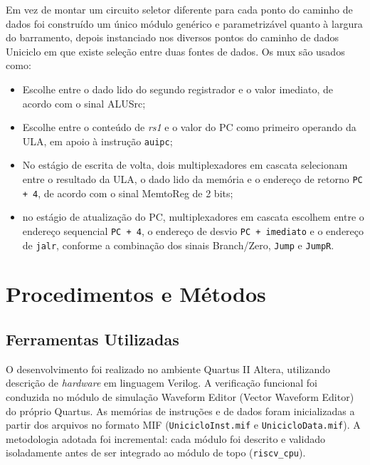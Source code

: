 \documentclass[conference]{IEEEtran}
\begin{document}
Em vez de montar um circuito seletor diferente para cada ponto do caminho de dados foi construído um único módulo 
genérico e parametrizável quanto à largura do barramento, depois
instanciado nos diversos pontos do caminho de dados Uniciclo em que existe seleção entre duas fontes de
dados. Os mux são usados como:
\begin{itemize}
    \item Escolhe entre o dado lido do segundo registrador e o valor imediato, de acordo com
o sinal ALUSrc;

    \item Escolhe entre o conteúdo de \textit{rs1} e o valor do PC como primeiro
operando da ULA, em apoio à instrução \texttt{auipc};

    \item No estágio de escrita de volta, dois multiplexadores em cascata selecionam entre o resultado da 
    ULA, o dado lido da memória e o endereço de 
    retorno \texttt{PC + 4}, de acordo com o sinal MemtoReg de 2 bits;

    \item no estágio de atualização do
    PC, multiplexadores em cascata escolhem entre o endereço sequencial \texttt{PC + 4}, o endereço de desvio
    \texttt{PC + imediato} e o endereço de \texttt{jalr}, conforme a combinação dos sinais Branch/Zero,
    \texttt{Jump} e \texttt{JumpR}.
\end{itemize} 

\section{Procedimentos e Métodos}

\subsection{Ferramentas Utilizadas}
O desenvolvimento foi realizado no ambiente Quartus II Altera, utilizando descrição de \textit{hardware} em
linguagem Verilog. A verificação funcional foi conduzida no
módulo de simulação Waveform Editor (Vector Waveform Editor) do próprio Quartus. 
As memórias de instruções e de dados foram inicializadas a partir dos
arquivos no formato MIF (\texttt{UnicicloInst.mif} e \texttt{UnicicloData.mif}). 
A metodologia adotada foi incremental: cada módulo foi
descrito e validado isoladamente antes de ser integrado ao módulo de topo (\texttt{riscv\_cpu}).
\end{document}
